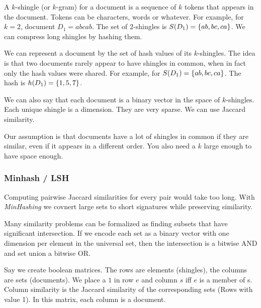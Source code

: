         A $k$-shingle (or $k$-gram) for a document is a sequence of $k$ tokens that appears in the document. Tokens can be characters, words or whatever. For example, for $k = 2$, document $D_1 = abcab$. The set of $2$-shingles is $S(D_1) = \{ab, bc, ca\}$. We can compress long shingles by hashing them. 
        
        We can represent a document by the set of hash values of its $k$-shingles. The idea is that two documents rarely appear to have shingles in common, when in fact only the hash values were shared. For example, for $S(D_1) = \{ab, bc, ca\}$. The hash is $h(D_1) = \{1, 5, 7\}$.
        
        We can also say that each document is a binary vector in the space of $k$-shingles. Each unique shingle is a dimension. They are very sparse. We can use Jaccard similarity.
        
        Our assumption is that documents have a lot of shingles in common if they are similar, even if it appears in a different order. You also need a $k$ large enough to have space enough.
        
    \subsubsection{Minhash / LSH}
        Computing pairwise Jaccard similarities for every pair would take too long. With \emph{MinHashing} we covnert large sets to short signatures while preserving similarity. 
        
        Many similarity problems can be formalized as finding subsets that have significant intersection. If we encode each set as a binary vector with one dimension per element in the universal set, then the intersection is a bitwise AND and set union a bitwise OR. 
        
        Say we create boolean matrices. The rows are elements (shingles), the columns are sets (documents). We place a $1$ in row $e$ and column $s$ iff $e$ is a member of s. Column similarity is the Jaccard similarity of the corresponding sets (Rows with value 1). In this matrix, each column is a document. 
        
